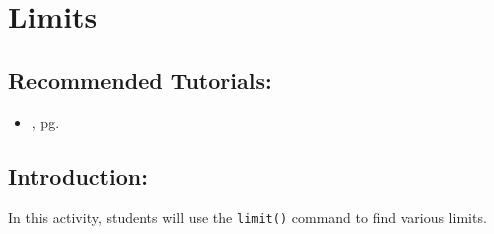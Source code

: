 \section{Limits}
\label{sec:limits}

\subsection*{Recommended Tutorials:}
\begin{itemize}[noitemsep]
	\item {}, pg. \pageref{chp:limits}
\end{itemize}

\subsection*{Introduction:}

In this activity, students will use the \texttt{limit()} command to find various limits.

